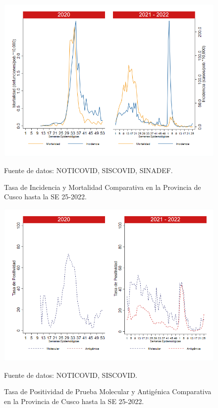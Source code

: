 \documentclass[12pt,a4paper,openany]{book}
\begin{document}
	\begin{figure}[h]
		\caption{Tasa de Incidencia y Mortalidad Comparativa en la Provincia de Cusco hasta la SE 25-2022.}\label{fig:inc_mort_cusco}
		\begin{center}
			\includegraphics[width=0.85\linewidth]{../figuras/incidencia_mortalidad_20_21_7.png}
		\end{center}
		{\footnotesize {Fuente de datos: NOTICOVID, SISCOVID, SINADEF.}}
	\end{figure}
	
	\begin{figure}[h]
		\caption{Tasa de Positividad de Prueba Molecular y Antigénica Comparativa en la Provincia de Cusco hasta la SE 25-2022.}\label{fig:positividad_cusco}
		\begin{center}
			\includegraphics[width=0.7\linewidth]{../figuras/positividad_20_21_7.png}
		\end{center}
		{\footnotesize {Fuente de datos: NOTICOVID, SISCOVID.}}
	\end{figure}
	
\end{document}
